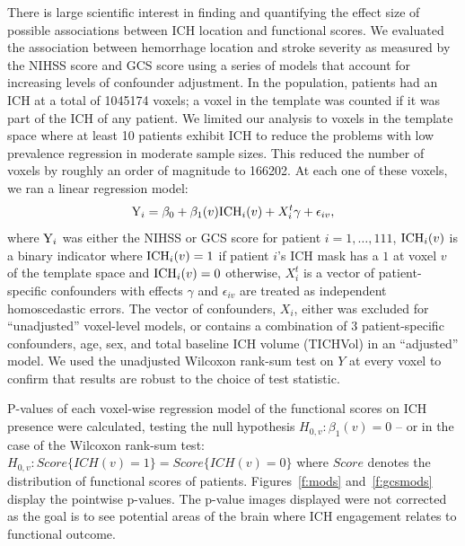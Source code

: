 \documentclass[10pt]{article}\usepackage[]{graphicx}\usepackage[]{color}
\begin{document}
There is large scientific interest in finding and quantifying the effect size of possible associations between ICH location and functional scores.  We evaluated the association between hemorrhage location and stroke severity as measured by the NIHSS score and GCS score using a series of models that account for increasing levels of confounder adjustment.  In the population, patients had an ICH at a total of 1045174 voxels; a voxel in the template was counted if it was part of the ICH of any patient.  We limited our analysis to voxels in the template space where at least 10 patients exhibit ICH to reduce the problems with low prevalence regression in moderate sample sizes.
This reduced the number of voxels by roughly an order of magnitude to 166202. At each one of these voxels, we ran a linear regression model:
\begin{equation}\label{eq:nihss_regression}
{\rm Y}_i=\beta_0+\beta_1(v) {\rm ICH}_i(v)+X^t_i \gamma + \epsilon_{iv}, 
\end{equation}
where ${\rm Y}_i$ was either the NIHSS or GCS score for patient $i=1,\ldots,111$, ${\rm ICH}_i(v)$ is a binary indicator where ${\rm ICH}_i(v) = 1$ if patient $i$'s ICH mask has a $1$ at voxel $v$ of the template space and ${\rm ICH}_i(v) = 0$ otherwise, $X^t_i$ is a vector of patient-specific confounders with effects $\gamma$ and $\epsilon_{iv}$ are treated as independent homoscedastic errors.  The vector of confounders, $X_i$, either was excluded for ``unadjusted'' voxel-level models, or contains a combination of $3$ patient-specific confounders, age, sex, and total baseline ICH volume (TICHVol) in an ``adjusted'' model.  We used the unadjusted Wilcoxon rank-sum test on $Y$ at every voxel to confirm that results are robust to the choice of test statistic.


P-values of each voxel-wise regression model of the functional scores on ICH presence were calculated, testing the null hypothesis $H_{0,v}:\beta_1(v)=0$ -- or in the case of the Wilcoxon rank-sum test: $H_{0,v}: Score\{ICH(v) = 1\} = Score\{ICH(v) = 0\}$ where $Score$ denotes the distribution of functional scores of patients.  Figures~\ref{f:mods} and~\ref{f:gcsmods} display the pointwise p-values.  The p-value images displayed were not corrected as the goal is to see potential areas of the brain where ICH engagement relates to functional outcome.
\end{document}
